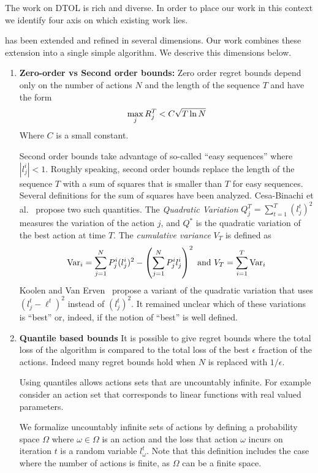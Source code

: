 \documentclass{article}[12pt]
\begin{document}
The work on DTOL is rich and diverse. In order to place our work in this context we identify four axis on which existing work lies.

has been extended and refined in several dimensions. Our work combines these extension into a single simple algorithm. We descrive this dimensions below.
\begin{enumerate}
\item {\bf Zero-order vs Second order bounds:} Zero order regret
  bounds \cite{freund1999adaptive} depend only on the number of
  actions $N$ and the length of the sequence $T$ and have
  the form
\begin{equation} \label{eqn:0-order-bound}
  \max_j R_j^T < C \sqrt{T \ln N}
\end{equation}
Where $C$ is a small constant.

Second order bounds take advantage of so-called ``easy sequences''
where $|l_j^i|<1$. Roughly speaking, second order bounds replace the
length of the sequence $T$ with a sum of squares that is smaller than $T$
for easy sequences.  Several definitions for the sum of
squares have been analyzed.  Cesa-Binachi et
al.~\cite{cesa2007improved} propose two such quantities. The {\em
  Quadratic Variation} $Q_j^T=\sum_{t=1}^T (l_j^t)^2$ measures the
variation of the action $j$, and $Q^{*}$ is the quadratic variation of
the best action at time $T$. The {\em cumulative variance} $V_T$ is defined as
\[
  \mbox{Var}_i = \sum_{j=1}^N P^i_j (l_j^i)^2 -  \left( \sum_{j=1}^N P^i_j
    l_j^i \right)^2 \mbox{ and } V_T= \sum_{i=1}^T \mbox{Var}_i
\]
Koolen and Van Erven~\cite{koolen2015second} propose a variant of the
quadratic variation that uses $(l_j^t-\ell^t)^2$ instead of
$(l_j^t)^2$. It remained unclear which of
these variations is ``best'' or, indeed, if the notion of ``best'' is
well defined. 

\item {\bf Quantile based bounds}
  It is possible to give regret bounds where the total loss of the
  algorithm is compared to the total loss of the best $\epsilon$
  fraction of the actions. Indeed many regret bounds hold when $N$ is
  replaced with $1/\epsilon$.

  Using quantiles allows actions sets that are uncountably infinite.
  For example consider an action set that corresponds to linear
  functions with real valued parameters.

  We formalize uncountably infinite sets of actions by defining a
  probability space $\Omega$ where $\omega \in \Omega$ is an action
  and the loss that action $\omega$ incurs on iteration $t$ is a
  random variable $l^t_\omega$. Note that this definition includes the
  case where the number of actions is finite, as $\Omega$ can be a
  finite space.


\end{enumerate}
\end{document}
